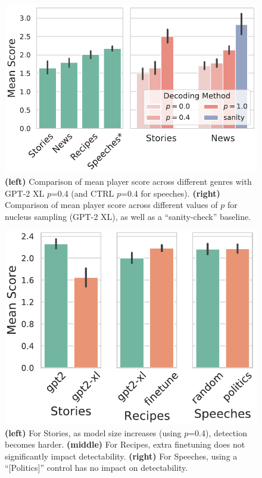 \begin{figure}[tb]
    \centering
    \includegraphics[width=1\linewidth]{figures/domain_topp.pdf}
    \caption{\textbf{(left)} Comparison of mean player score across different genres with GPT-2 XL $p$=0.4 (and CTRL $p$=0.4 for speeches). \textbf{(right)} Comparison of mean player score across different values of $p$ for nucleus sampling (GPT-2 XL), as well as a ``sanity-check'' baseline.}
    \label{fig:genre_top_p}
\end{figure}

\begin{figure}[tb]
    \centering
    \includegraphics[width=0.7\linewidth]{figures/model_size_and_finetuning.pdf}
    \caption{\textbf{(left)} For Stories, as model size increases (using $p$=0.4), detection becomes harder. \textbf{(middle)} For Recipes, extra finetuning does not significantly impact detectability. \textbf{(right)} For Speeches, using a ``[Politics]'' control has no impact on detectability.}
    \label{fig:model_size_finetuning}
\end{figure}


